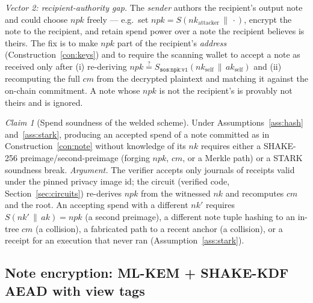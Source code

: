 \documentclass[11pt]{article}
\newcommand{\code}[1]{\texttt{#1}}
\newcommand{\shake}{SHAKE\mbox{-}256}
\newcommand{\concat}{\,\|\,}
\theoremstyle{plain}
\theoremstyle{definition}
\theoremstyle{remark}
\newtheorem{claimx}[theorem]{Claim}
\begin{document}
\emph{Vector 2: recipient-authority gap.} The \emph{sender} authors the
recipient's output note and could choose $\mathit{npk}$ freely --- e.g.\ set
$\mathit{npk} = S(\mathit{nk}_{\mathrm{attacker}} \concat \cdot)$, encrypt
the note to the recipient, and retain spend power over a note the recipient
believes is theirs. The fix is to make $\mathit{npk}$ part of the
recipient's \emph{address} (Construction~\ref{con:keys}) and to require the
scanning wallet to accept a note as received only after (i) re-deriving
$\mathit{npk} \stackrel{?}{=} S_{\code{sos:npk:v1}}(\mathit{nk}_{\mathrm{self}}
\concat \mathit{ak}_{\mathrm{self}})$ and (ii) recomputing the full
$\mathit{cm}$ from the decrypted plaintext and matching it against the
on-chain commitment. A note whose $\mathit{npk}$ is not the recipient's is
provably not theirs and is ignored.

\begin{claimx}[Spend soundness of the welded scheme]
\label{clm:ownership}
Under Assumptions~\ref{ass:hash} and~\ref{ass:stark}, producing an accepted
spend of a note committed as in Construction~\ref{con:note} without knowledge
of its $\mathit{nk}$ requires either a \shake{} preimage/second-preimage
(forging $\mathit{npk}$, $\mathit{cm}$, or a Merkle path) or a STARK
soundness break. \emph{Argument.} The verifier accepts only journals of
receipts valid under the pinned privacy image id; the circuit (verified code,
Section~\ref{sec:circuits}) re-derives $\mathit{npk}$ from the witnessed
$\mathit{nk}$ and recomputes $\mathit{cm}$ and the root. An accepting spend
with a different $\mathit{nk}'$ requires
$S(\mathit{nk}' \concat \mathit{ak}) = \mathit{npk}$ (a second preimage), a
different note tuple hashing to an in-tree $\mathit{cm}$ (a collision), a
fabricated path to a recent anchor (a collision), or a receipt for an
execution that never ran (Assumption~\ref{ass:stark}).
\end{claimx}

\subsection{Note encryption: ML-KEM + SHAKE-KDF AEAD with view tags}
\label{sec:notes-enc}
\end{document}
